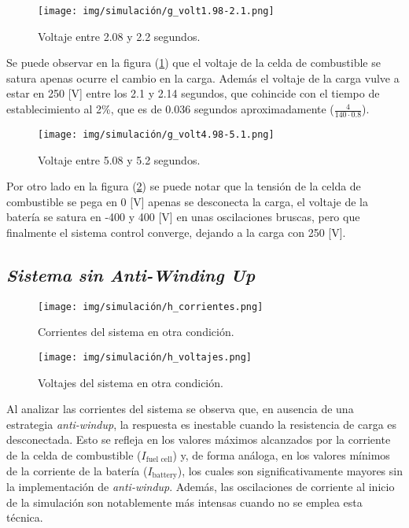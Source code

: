 
\begin{figure}[H]
    \centering
    \texttt{[image: img/simulación/g\_volt1.98-2.1.png]}
    \caption{Voltaje entre 2.08 y 2.2 segundos.}
    \label{fig:g_volt1.98-2.1}
\end{figure}

Se puede observar en la figura (\ref{fig:g_volt1.98-2.1}) que el voltaje de la celda de 
combustible se satura apenas ocurre el cambio en la carga. Además el voltaje de la carga
vulve a estar en 250 [V] entre los 2.1 y 2.14 segundos, que cohincide con el tiempo de
establecimiento al 2\%, que es de 0.036 segundos aproximadamente ($\frac{4}{140\cdot0.8}$).

\begin{figure}[H]
    \centering
    \texttt{[image: img/simulación/g\_volt4.98-5.1.png]}
    \caption{Voltaje entre 5.08 y 5.2 segundos.}
    \label{fig:g_volt4.98-5.1}
\end{figure}

Por otro lado en la figura (\ref{fig:g_volt4.98-5.1}) se puede notar que la tensión de la 
celda de combustible se pega en 0 [V] apenas se desconecta la carga, el voltaje de la batería
se satura en -400 y 400 [V] en unas oscilaciones bruscas, pero que finalmente el sistema
control converge, dejando a la carga con 250 [V].

\subsection{\textit{Sistema sin Anti-Winding Up}}

\begin{figure}[H]
    \centering
    \texttt{[image: img/simulación/h\_corrientes.png]}
    \caption{Corrientes del sistema en otra condición.}
    \label{fig:h_corrientes}
\end{figure}

\begin{figure}[H]
    \centering
    \texttt{[image: img/simulación/h\_voltajes.png]}
    \caption{Voltajes del sistema en otra condición.}
    \label{fig:h_voltajes}
\end{figure}
Al analizar las corrientes del sistema se observa que, en ausencia de una estrategia 
\textit{anti-windup}, la respuesta es inestable cuando la resistencia de carga es desconectada.
Esto se refleja en los valores máximos alcanzados por la corriente de la celda de 
combustible ($I_{\text{fuel cell}}$) y, de forma análoga, en los valores 
mínimos de la corriente de la batería ($I_{\text{battery}}$), los cuales son significativamente 
mayores sin la implementación de \textit{anti-windup}. Además, las oscilaciones de corriente 
al inicio de la simulación son notablemente más intensas cuando no se emplea esta técnica.


